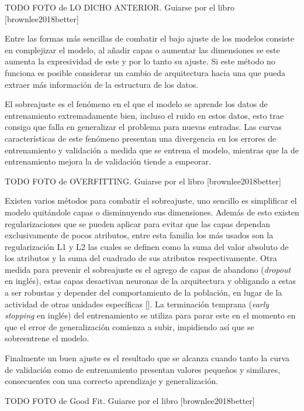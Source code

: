 TODO FOTO de LO DICHO ANTERIOR. Guiarse por el libro [brownlee2018better]

Entre las formas más sencillas de combatir el bajo ajuste de los modelos consiste en complejizar el modelo, al añadir
capas o aumentar las dimensiones se este aumenta la expresividad de este y por lo tanto su ajuste. Si este método 
no funciona es posible considerar un cambio de arquitectura hacia una que pueda extraer más información de la 
estructura de los datos. 

El sobreajuste es el fenómeno en el que el modelo se aprende los datos de entrenamiento extremadamente bien, incluso
el ruido en estos datos, esto trae consigo que falla en generalizar el problema para nuevas entradas. Las curvas 
características de este fenómeno presentan una divergencia en los errores de entrenamiento y validación a medida
que se entrena el modelo, mientras que la de entrenamiento mejora la de validación tiende a empeorar. 

TODO FOTO de OVERFITTING. Guiarse por el libro [brownlee2018better]

Existen varios métodos para combatir el sobreajuste, uno sencillo es simplificar el modelo quitándole capas 
o disminuyendo sus dimensiones. Además de esto existen regularizaciones que se pueden aplicar para evitar que 
las capas dependan exclusivamente de pocos atributos, entre esta familia los más usados son la regularización
L1 y L2 las cuales se definen como la suma del valor absoluto de los atributos y la suma del cuadrado de sus 
atributos respectivamente. Otra medida para prevenir el sobreajuste es el agrego de capas de abandono 
(\emph{dropout} en inglés), estas capas desactivan neuronas de la arquitectura y obligando a 
estas a ser robustas y depender del comportamiento de la población, en lugar de la actividad de otras unidades 
específicas [\cite{baldi2013dropout}]. La terminación temprana (\emph{early stopping} en inglés) del entrenamiento
se utiliza para parar este en el momento en que el error de generalización comienza a subir, impidiendo así que 
se sobreentrene el modelo.

Finalmente un buen ajuste es el resultado que se alcanza cuando tanto la curva de validación como de entrenamiento
presentan valores pequeños y similares, consecuentes con una correcto aprendizaje y generalización.

TODO FOTO de Good Fit. Guiarse por el libro [brownlee2018better]

